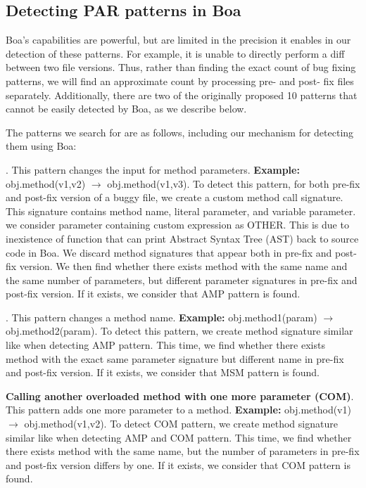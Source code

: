 \documentclass{sig-alternate-05-2015}
\begin{document}
\subsection{Detecting PAR patterns in Boa}

Boa's capabilities are powerful, but are limited in the precision it enables in
our detection of these patterns. For example, it is unable to directly perform a
diff between two file versions. Thus, rather than finding the exact count of
bug fixing patterns, we will find an approximate count by processing pre- and
post- fix files separately.  Additionally, there are
two of the originally proposed 10 patterns that cannot be easily detected by
Boa, as we describe below. 

The patterns we search for are as follows, including our mechanism for
detecting them using Boa:

\vspace{1ex}
.  This pattern changes the
input for method parameters.  {\bf Example:} obj.method(v1,v2) $\rightarrow$
obj.method(v1,v3). To detect this pattern, for both pre-fix and post-fix version
of a buggy file, we create a custom method call signature. This signature
contains method name, literal parameter, and variable parameter. we consider
parameter containing custom expression as OTHER. This is due to inexistence of
function that can print Abstract Syntax Tree (AST) back to source code in
Boa. We discard method signatures that appear both in pre-fix and post-fix
version. We then find whether there exists method with the same name and the
same number of parameters, but different parameter signatures in pre-fix and
post-fix version. If it exists, we consider that AMP pattern is found.

\vspace{1ex}
.  This
pattern changes a method name.  {\bf Example:} obj.method1(param) $\rightarrow$
obj.method2(param).  To detect this pattern, we create method signature similar
like when detecting AMP pattern. This time, we find whether there exists method
with the exact same parameter signature but different name in pre-fix and
post-fix version. If it exists, we consider that MSM pattern is found.

\vspace{1ex}
\noindent
{\bf Calling another overloaded method with one more parameter (COM)}. This
pattern adds one more parameter to a method. 
	{\bf Example:} obj.method(v1) $\rightarrow$ obj.method(v1,v2).
  To detect COM pattern, we create method signature similar like when detecting
  AMP and COM pattern. This time, we find whether there exists method with
  the same name, but the number of parameters in pre-fix and post-fix version
  differs by one. If it exists, we consider that COM pattern is found.
\end{document}

